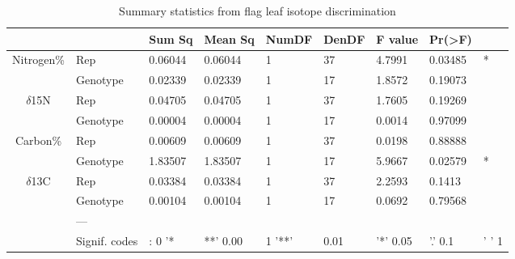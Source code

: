 \documentclass{article}
\begin{document}
\begin{table}[ht]
	\centering
	\caption{Summary statistics from flag leaf isotope discrimination}
	\label{isotope_statistics}
	\begin{adjustbox}
		{width=\textwidth}
		\begin{tabular}{@{}cllllllll@{}}
			\toprule \multicolumn{1}{l}{}         & \textbf{}     & \textbf{Sum Sq} & \textbf{Mean Sq} & \textbf{NumDF} & \textbf{DenDF} & \textbf{F value} & \textbf{Pr(\textgreater{}F)} &       \\
			\midrule \multirow{2}{*}{Nitrogen\%}  & Rep           & 0.06044         & 0.06044          & 1              & 37             & 4.7991           & 0.03485                      & *     \\
			                                      & Genotype      & 0.02339         & 0.02339          &  1              & 17             & 1.8572           & 0.19073                      &       \\
			\midrule \multirow{2}{*}{$\delta$15N} & Rep           & 0.04705         & 0.04705          & 1              & 37             & 1.7605           & 0.19269                      &       \\
			                                      & Genotype      & 0.00004         & 0.00004          & 1              & 17             & 0.0014           & 0.97099                      &       \\
			\midrule \multirow{2}{*}{Carbon\%}    & Rep           & 0.00609         & 0.00609          & 1              & 37             & 0.0198           & 0.88888                      &       \\
			                                      & Genotype      & 1.83507         & 1.83507          & 1              & 17             & 5.9667           & 0.02579                      & *     \\
			\midrule \multirow{2}{*}{$\delta$13C} & Rep           & 0.03384         & 0.03384          & 1              & 37             & 2.2593           & 0.1413                       &       \\
			                                      & Genotype      & 0.00104         & 0.00104          & 1              & 17             & 0.0692           & 0.79568                      &       \\
			\multicolumn{1}{l}{}                  & ---           &                 &                  &                &                &                  &                              &       \\
			\multicolumn{1}{l}{}                  & Signif. codes & : 0 '*          & **' 0.00         & 1 '**'         & 0.01           & '*' 0.05         & '.' 0.1                      & ' ' 1 \\
			\bottomrule
		\end{tabular}
	\end{adjustbox}
\end{table}
\end{document}
